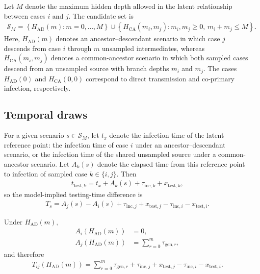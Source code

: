\documentclass[10pt,a4paper]{article}
\begin{document}
Let $M$ denote the maximum hidden depth allowed in the latent relationship between cases $i$ and $j$. The candidate set is
\begin{align}
\mathcal{S}_M
=
\left\{
H_{\mathrm{AD}}(m): m=0,\ldots,M
\right\}
\cup
\left\{
H_{\mathrm{CA}}(m_i,m_j): m_i,m_j \ge 0,\ m_i+m_j \le M
\right\}.
\end{align}
Here, $H_{\mathrm{AD}}(m)$ denotes an ancestor--descendant scenario in which case $j$ descends from case $i$ through $m$ unsampled intermediates, whereas $H_{\mathrm{CA}}(m_i,m_j)$ denotes a common-ancestor scenario in which both sampled cases descend from an unsampled source with branch depths $m_i$ and $m_j$. The cases $H_{\mathrm{AD}}(0)$ and $H_{\mathrm{CA}}(0,0)$ correspond to direct transmission and co-primary infection, respectively.

\subsection*{Temporal draws}

For a given scenario $s \in \mathcal{S}_M$, let $t_x$ denote the infection time of the latent reference point: the infection time of case $i$ under an ancestor--descendant scenario, or the infection time of the shared unsampled source under a common-ancestor scenario. Let $A_k(s)$ denote the elapsed time from this reference point to infection of sampled case $k \in \{i,j\}$. Then
\begin{align}
t_{\mathrm{test},k}
=
t_x + A_k(s) + \tau_{\mathrm{inc},k} + x_{\mathrm{test},k},
\end{align}
so the model-implied testing-time difference is
\begin{align}
T_s
=
A_j(s) - A_i(s)
+
\tau_{\mathrm{inc},j} + x_{\mathrm{test},j}
-
\tau_{\mathrm{inc},i} - x_{\mathrm{test},i}.
\label{eq:tij_master}
\end{align}

Under $H_{\mathrm{AD}}(m)$,
\begin{align}
A_i\!\left(H_{\mathrm{AD}}(m)\right) &= 0,\\
A_j\!\left(H_{\mathrm{AD}}(m)\right) &= \sum_{r=0}^{m}\tau_{\mathrm{gen},r},
\end{align}
and therefore
\begin{align}
T_{ij}\!\left(H_{\mathrm{AD}}(m)\right)
=
\sum_{r=0}^{m}\tau_{\mathrm{gen},r}
+
\tau_{\mathrm{inc},j} + x_{\mathrm{test},j}
-
\tau_{\mathrm{inc},i} - x_{\mathrm{test},i}.
\label{eq:T_AD}
\end{align}
\end{document}

